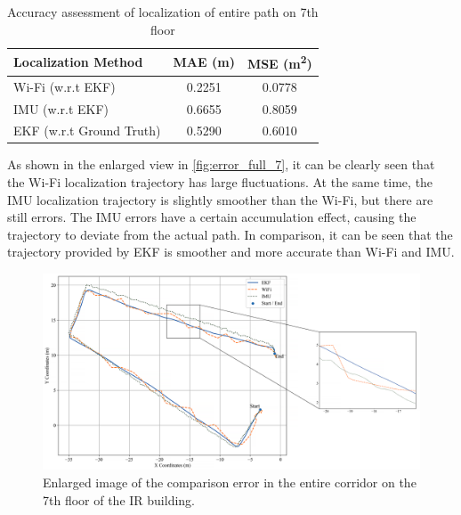 \documentclass[12pt,a4paper]{article}
\numberwithin{equation}{section}
\begin{document}
\begin{table}[H]
\centering
\caption{Accuracy assessment of localization of entire path on 7th floor}
\label{tab:localization_error}
\begin{tabular}{lcc}
\toprule
\textbf{Localization Method} & \textbf{MAE (m)} & \textbf{MSE (m\textsuperscript{2})} \\
\midrule
Wi-Fi (w.r.t EKF) & 0.2251 & 0.0778 \\
IMU (w.r.t EKF)   & 0.6655 & 0.8059 \\
EKF (w.r.t Ground Truth)    & 0.5290 & 0.6010 \\
\bottomrule
\end{tabular}
\end{table}
\noindent As shown in the enlarged view in \autoref{fig:error_full_7}, it can be clearly seen that the Wi-Fi localization trajectory has large fluctuations. At the same time, the IMU localization trajectory is slightly smoother than the Wi-Fi, but there are still errors. The IMU errors have a certain accumulation effect, causing the trajectory to deviate from the actual path. In comparison, it can be seen that the trajectory provided by EKF is smoother and more accurate than Wi-Fi and IMU.
\begin{figure}[H]
    \centering
    \includegraphics[width=1\linewidth]{Amplification images/wifi/full_circle.png}
    \caption{Enlarged image of the comparison error in the entire corridor on the 7th floor of the IR building.}
    \label{fig:error_full_7}
\end{figure}
\end{document}
